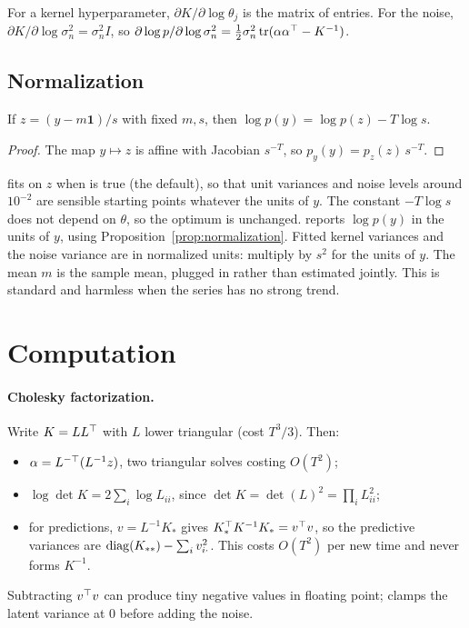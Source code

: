 \documentclass[11pt,a4paper]{article}
\begin{document}
For a kernel hyperparameter, $\partial K/\partial\log\theta_j$ is the matrix of
 entries. For the noise, $\partial K/\partial\log\sigma_n^2=\sigma_n^2I$, so
$\partial\log p/\partial\log\sigma_n^2=\tfrac12\sigma_n^2\operatorname{tr}(\alpha\alpha^\top-K^{-1})$.

\subsection{Normalization}\label{sec:normalization}

\begin{proposition}\label{prop:normalization}
If $z=(y-m\mathbf1)/s$ with fixed $m,s$, then $\log p(y)=\log p(z)-T\log s$.
\end{proposition}
\begin{proof}
The map $y\mapsto z$ is affine with Jacobian $s^{-T}$, so
$p_y(y)=p_z(z)\,s^{-T}$.
\end{proof}

 fits on $z$ when  is true (the default), so that
unit variances and noise levels around $10^{-2}$ are sensible starting points
whatever the units of $y$. The constant $-T\log s$ does not depend on $\theta$,
so the optimum is unchanged.  reports $\log p(y)$
in the units of $y$, using Proposition~\ref{prop:normalization}. Fitted kernel
variances and the noise variance are in normalized units: multiply by $s^2$ for
the units of $y$. The mean $m$ is the sample mean, plugged in rather than estimated
jointly. This is standard and harmless when the series has no strong trend.

\section{Computation}

\paragraph{Cholesky factorization.} Write $K=LL^\top$ with $L$ lower triangular (cost $T^3/3$). Then:
\begin{itemize}
  \item $\alpha=L^{-\top}(L^{-1}z)$, two triangular solves costing $O(T^2)$;
  \item $\log\det K=2\sum_i\log L_{ii}$, since $\det K=\det(L)^2=\prod_iL_{ii}^2$;
  \item for predictions, $v=L^{-1}K_*$ gives $K_*^\top K^{-1}K_*=v^\top v$, so the
        predictive variances are $\operatorname{diag}(K_{**})-\sum_i v_{i\cdot}^2$. This costs $O(T^2)$ per
        new time and never forms $K^{-1}$.
\end{itemize}
Subtracting $v^\top v$ can produce tiny negative values in floating point;
 clamps the latent variance at $0$ before adding the noise.
\end{document}
